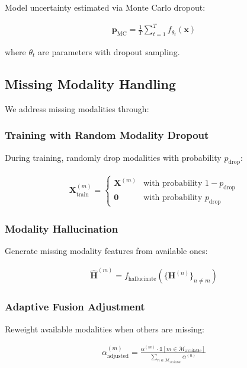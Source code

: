 \documentclass[journal]{IEEEtran}
\begin{document}
Model uncertainty estimated via Monte Carlo dropout:

\begin{align}
\mathbf{p}_{\text{MC}} = \frac{1}{T} \sum_{t=1}^T f_{\theta_t}(\mathbf{x})
\end{align}

where $\theta_t$ are parameters with dropout sampling.

\subsection{Missing Modality Handling}

We address missing modalities through:

\subsubsection{Training with Random Modality Dropout}

During training, randomly drop modalities with probability $p_{\text{drop}}$:

\begin{align}
\mathbf{X}^{(m)}_{\text{train}} = \begin{cases}
\mathbf{X}^{(m)} & \text{with probability } 1-p_{\text{drop}} \\
\mathbf{0} & \text{with probability } p_{\text{drop}}
\end{cases}
\end{align}

\subsubsection{Modality Hallucination}

Generate missing modality features from available ones:

\begin{align}
\hat{\mathbf{H}}^{(m)} = f_{\text{hallucinate}}(\{\mathbf{H}^{(n)}\}_{n \neq m})
\end{align}

\subsubsection{Adaptive Fusion Adjustment}

Reweight available modalities when others are missing:

\begin{align}
\alpha^{(m)}_{\text{adjusted}} = \frac{\alpha^{(m)} \cdot \mathbb{1}[m \in \mathcal{M}_{\text{available}}]}{\sum_{n \in \mathcal{M}_{\text{available}}} \alpha^{(n)}}
\end{align}
\end{document}
